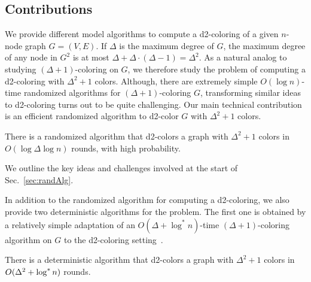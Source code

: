 \subsection{Contributions}

We provide different \CONGEST model algorithms to compute a d2-coloring of a given $n$-node graph $G=(V,E)$. If $\Delta$ is the maximum degree of $G$, the maximum degree of any node in $G^2$ is at most $\Delta + \Delta\cdot(\Delta-1)=\Delta^2$. As a natural analog to studying $(\Delta+1)$-coloring on $G$, we therefore study the problem of computing a d2-coloring with $\Delta^2+1$ colors. Although, there are extremely simple $O(\log n)$-time randomized algorithms for $(\Delta+1)$-coloring $G$, transforming similar ideas to d2-coloring turns out to be quite challenging. Our main technical contribution is an efficient randomized algorithm to d2-color $G$ with $\Delta^2+1$ colors. 

\begin{theorem}
\label{thm:d2ColoringRand}
There is a randomized \CONGEST algorithm that d2-colors a graph with $\Delta^2+1$ colors in $O(\log \Delta \log n)$ rounds, with high probability.
\end{theorem}

We outline the key ideas and challenges involved at the start of Sec.~\ref{sec:randAlg}. %

In addition to the randomized algorithm for computing a d2-coloring, we also provide two deterministic algorithms for the problem. The first one is obtained by a relatively simple adaptation of an $O(\Delta+\log^*n)$-time $(\Delta+1)$-coloring \CONGEST algorithm on $G$ to the d2-coloring setting~\cite{BEG18}.

\begin{theorem}
\label{thm:d2ColoringDelta}
There is a deterministic \CONGEST algorithm that d2-colors a graph with $\Delta^2+1$ colors in $O(\Delta^2+\log^* n)$ rounds.
\end{theorem}

